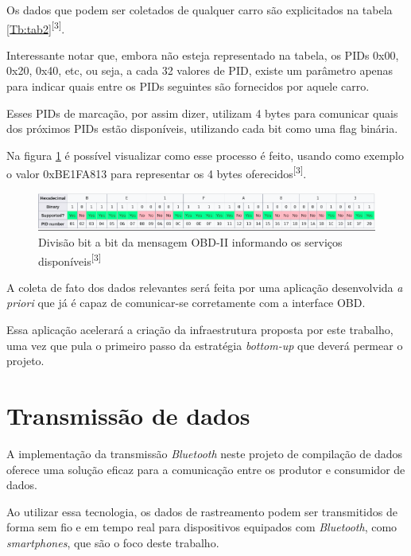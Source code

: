 Os dados que podem ser coletados de qualquer carro são explicitados na tabela \ref{Tb:tab2}\textsuperscript{[3]}.



Interessante notar que, embora não esteja representado na tabela, os PIDs 0x00, 0x20, 0x40, etc, ou seja, a cada 32 valores de PID, existe um parâmetro apenas para indicar quais entre os PIDs seguintes são fornecidos por aquele carro.

Esses PIDs de marcação, por assim dizer, utilizam 4 bytes para comunicar quais dos próximos PIDs estão disponíveis, utilizando cada bit como uma flag binária. 

Na figura \ref{fig:bitwise_obd2} é possível visualizar como esse processo é feito, usando como exemplo o valor 0xBE1FA813 para representar os 4 bytes oferecidos\textsuperscript{[3]}.

\begin{figure}[hp]
    \centering
    
    \includegraphics[scale=0.7]{figures/tabela_dados_disponiveis.png}
    
    \caption{Divisão bit a bit da mensagem OBD-II informando os serviços disponíveis\textsuperscript{[3]}}
    
    \label{fig:bitwise_obd2}
\end{figure}

A coleta de fato dos dados relevantes será feita por uma aplicação desenvolvida \textit{a priori} que já é capaz de comunicar-se corretamente com a interface OBD.

Essa aplicação acelerará a criação da infraestrutura proposta por este trabalho, uma vez que pula o primeiro passo da estratégia \textit{bottom-up} que deverá permear o projeto.

\section{Transmissão de dados}

A implementação da transmissão \textit{Bluetooth} neste projeto de compilação de dados oferece uma solução eficaz para a comunicação entre os produtor e consumidor de dados. 

Ao utilizar essa tecnologia, os dados de rastreamento podem ser transmitidos de forma sem fio e em tempo real para dispositivos equipados com \textit{Bluetooth}, como \textit{smartphones}, que são o foco deste trabalho.

